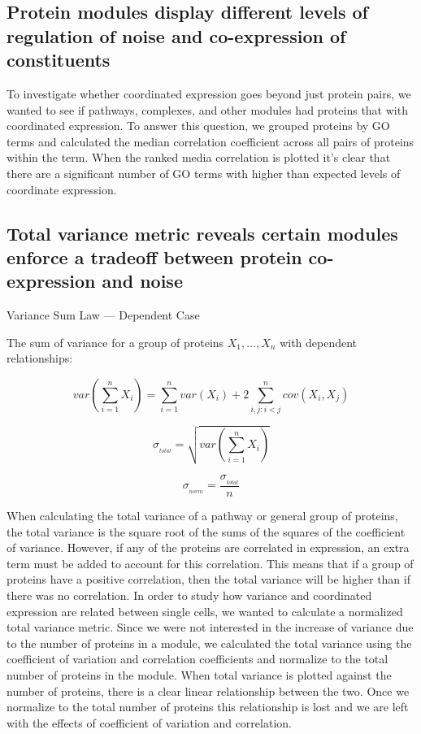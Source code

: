 \documentclass[11pt,]{article}
\begin{document}
\hypertarget{protein-modules-display-different-levels-of-regulation-of-noise-and-co-expression-of-constituents}{%
\subsection{Protein modules display different levels of regulation of
noise and co-expression of
constituents}\label{protein-modules-display-different-levels-of-regulation-of-noise-and-co-expression-of-constituents}}

To investigate whether coordinated expression goes beyond just protein
pairs, we wanted to see if pathways, complexes, and other modules had
proteins that with coordinated expression. To answer this question, we
grouped proteins by GO terms and calculated the median correlation
coefficient across all pairs of proteins within the term. When the
ranked media correlation is plotted it's clear that there are a
significant number of GO terms with higher than expected levels of
coordinate expression.

\hypertarget{total-variance-metric-reveals-certain-modules-enforce-a-tradeoff-between-protein-co-expression-and-noise}{%
\subsection{Total variance metric reveals certain modules enforce a
tradeoff between protein co-expression and
noise}\label{total-variance-metric-reveals-certain-modules-enforce-a-tradeoff-between-protein-co-expression-and-noise}}

Variance Sum Law --- Dependent Case

The sum of variance for a group of proteins \(X_{1},\dotsc,X_{n}\) with
dependent relationships:

\[var\left(\sum_{i=1}^n X_{i}\right) = \sum_{i=1}^{n} var(X_{i}) + 2\sum_{i,j:i<j}^{n} cov(X_{i},X_{j})\]

\[\sigma_{{}_{total}} = \sqrt{var\left(\sum_{i=1}^n X_{i}\right)}\]

\[\sigma_{{}_{norm}} = \dfrac{\sigma_{{}_{total}}}{n}\]

When calculating the total variance of a pathway or general group of
proteins, the total variance is the square root of the sums of the
squares of the coefficient of variance. However, if any of the proteins
are correlated in expression, an extra term must be added to account for
this correlation. This means that if a group of proteins have a positive
correlation, then the total variance will be higher than if there was no
correlation. In order to study how variance and coordinated expression
are related between single cells, we wanted to calculate a normalized
total variance metric. Since we were not interested in the increase of
variance due to the number of proteins in a module, we calculated the
total variance using the coefficient of variation and correlation
coefficients and normalize to the total number of proteins in the
module. When total variance is plotted against the number of proteins,
there is a clear linear relationship between the two. Once we normalize
to the total number of proteins this relationship is lost and we are
left with the effects of coefficient of variation and correlation.
\end{document}
